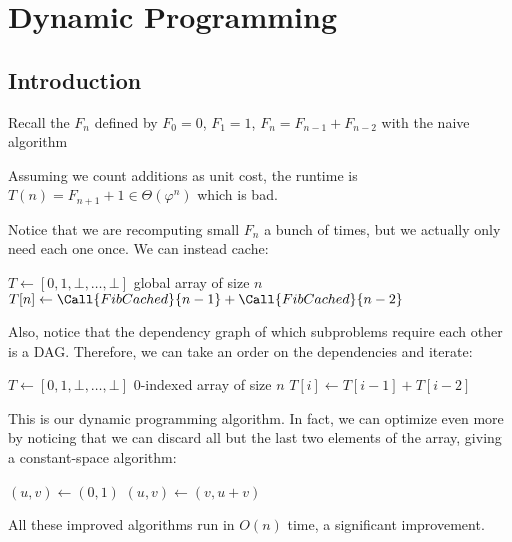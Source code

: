 \chapter{Dynamic Programming}
\section{Introduction}

Recall the  $F_n$ defined by
$F_0 = 0$, $F_1 = 1$, $F_n = F_{n-1} + F_{n-2}$ with the naive algorithm
\begin{algorithm}[H]
  \caption{}
  \begin{algorithmic}[1]
     
     
    \Else {}
    \EndIf
  \end{algorithmic}
\end{algorithm}
Assuming we count additions as unit cost,
the runtime is $T(n) = F_{n+1} + 1 \in \Theta(\varphi^n)$ which is bad.

Notice that we are recomputing small $F_n$ a bunch of times,
but we actually only need each one once.
We can instead cache:
\begin{algorithm}[H]
  \caption{}
  \begin{algorithmic}[1]
    \Require $T \gets [0,1,\bot,\dotsc,\bot]$ global array of size $n$
     \State $T[n] \gets \Call{FibCached}{n-1} + \Call{FibCached}{n-2}$ \EndIf
    \State {}
  \end{algorithmic}
\end{algorithm}
Also, notice that the dependency graph of which subproblems require each other is a DAG.
Therefore, we can take an order on the dependencies and iterate:
\begin{algorithm}
  \caption{}
  \begin{algorithmic}[1]
    \State $T \gets [0,1,\bot,\dotsc,\bot]$ 0-indexed array of size $n$
    \State $T[i] \gets T[i-1] + T[i-2]$
    \EndFor
    \State {}
  \end{algorithmic}
\end{algorithm}
This is our dynamic programming algorithm.
In fact, we can optimize even more by noticing that we can discard
all but the last two elements of the array,
giving a constant-space algorithm:
\begin{algorithm}[H]
  \caption{}
  \begin{algorithmic}[1]
    \State $(u,v) \gets (0,1)$
    \State $(u,v) \gets (v,u+v)$
    \EndFor
  \end{algorithmic}
\end{algorithm}
All these improved algorithms run in $O(n)$ time, a significant improvement.

